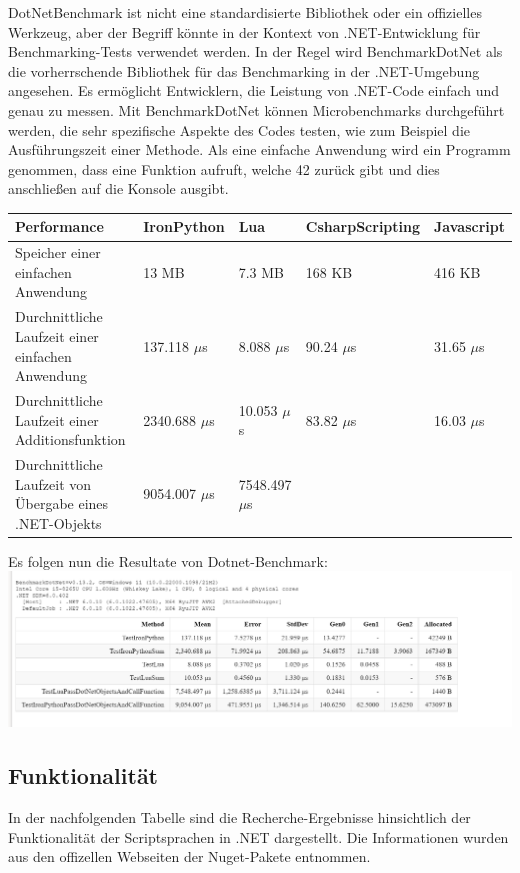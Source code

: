 DotNetBenchmark ist nicht eine standardisierte Bibliothek oder ein offizielles Werkzeug, aber der Begriff könnte in der Kontext von .NET-Entwicklung für Benchmarking-Tests verwendet werden. In der Regel wird BenchmarkDotNet als die vorherrschende Bibliothek für das Benchmarking in der .NET-Umgebung angesehen. Es ermöglicht Entwicklern, die Leistung von .NET-Code einfach und genau zu messen. 
Mit BenchmarkDotNet können Microbenchmarks durchgeführt werden, die sehr spezifische Aspekte des Codes testen, wie zum Beispiel die Ausführungszeit einer Methode.
Als eine einfache Anwendung wird ein Programm genommen, dass eine Funktion aufruft, welche 42 zurück gibt 
und dies anschließen auf die Konsole ausgibt.
\begin{table}[H]
    \begin{tabular}{|p{3cm}|p{3cm}|p{3cm}|p{3cm}|p{3cm}|}
        \hline
        Performance & IronPython & Lua & CsharpScripting & Javascript\\ \hline
        Speicher einer einfachen Anwendung & 13 MB & 7.3 MB & 168 KB & 416 KB  \\ \hline
        Durchnittliche Laufzeit einer einfachen Anwendung & 137.118 $\mu$s & 8.088 $\mu$s & 90.24 $\mu$s & 31.65 $\mu$s \\ \hline
        Durchnittliche Laufzeit einer Additionsfunktion & 2340.688 $\mu$s & 10.053 $\mu$s & 83.82 $\mu$s & 16.03 $\mu$s \\ \hline
        Durchnittliche Laufzeit von Übergabe eines .NET-Objekts & 9054.007 $\mu$s & 7548.497 $\mu$s &  & \\ \hline
    \end{tabular}
\end{table}

\newpage
Es folgen nun die Resultate von Dotnet-Benchmark:
\linebreak
\includegraphics[scale=0.5]{pics/benchmark_results_NluaVsIronPython.png}
\newpage
\subsection{Funktionalität}
In der nachfolgenden Tabelle sind die Recherche-Ergebnisse hinsichtlich der Funktionalität der Scriptsprachen in .NET dargestellt.
Die Informationen wurden aus den offizellen Webseiten der Nuget-Pakete entnommen.

